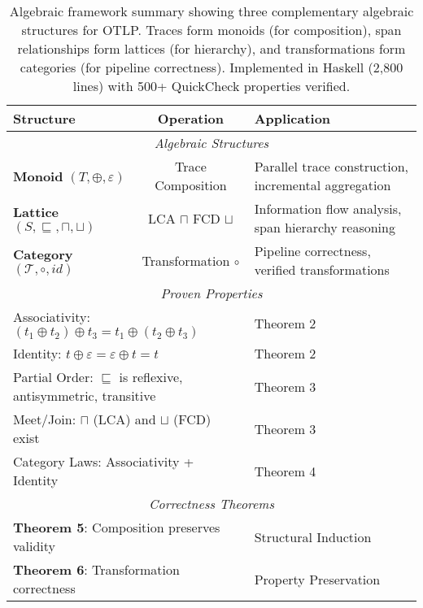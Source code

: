 
\begin{table}[t]
\centering
\caption{Algebraic framework summary showing three complementary algebraic structures for OTLP. Traces form monoids (for composition), span relationships form lattices (for hierarchy), and transformations form categories (for pipeline correctness). Implemented in Haskell (2,800 lines) with 500+ QuickCheck properties verified.}
\label{tab:algebraic-framework}
\small
\begin{tabular}{|l|c|p{4cm}|}
\hline
\textbf{Structure} & \textbf{Operation} & \textbf{Application} \\
\hline
\hline
\multicolumn{3}{|c|}{\textit{Algebraic Structures}} \\
\hline
\makecell[l]{\textbf{Monoid}\\ $(T, \oplus, \varepsilon)$} & \makecell{Trace\\ Composition} & Parallel trace construction, incremental aggregation \\
\hline
\makecell[l]{\textbf{Lattice}\\ $(S, \sqsubseteq, \sqcap, \sqcup)$} & \makecell{LCA $\sqcap$\\ FCD $\sqcup$} & Information flow analysis, span hierarchy reasoning \\
\hline
\makecell[l]{\textbf{Category}\\ $(\mathcal{T}, \circ, id)$} & \makecell{Transformation\\ $\circ$} & Pipeline correctness, verified transformations \\
\hline
\hline
\multicolumn{3}{|c|}{\textit{Proven Properties}} \\
\hline
\multicolumn{2}{|l|}{Associativity: $(t_1 \oplus t_2) \oplus t_3 = t_1 \oplus (t_2 \oplus t_3)$} & Theorem 2 \\
\multicolumn{2}{|l|}{Identity: $t \oplus \varepsilon = \varepsilon \oplus t = t$} & Theorem 2 \\
\multicolumn{2}{|l|}{Partial Order: $\sqsubseteq$ is reflexive, antisymmetric, transitive} & Theorem 3 \\
\multicolumn{2}{|l|}{Meet/Join: $\sqcap$ (LCA) and $\sqcup$ (FCD) exist} & Theorem 3 \\
\multicolumn{2}{|l|}{Category Laws: Associativity + Identity} & Theorem 4 \\
\hline
\hline
\multicolumn{3}{|c|}{\textit{Correctness Theorems}} \\
\hline
\multicolumn{2}{|l|}{\textbf{Theorem 5}: Composition preserves validity} & Structural Induction \\
\multicolumn{2}{|l|}{\textbf{Theorem 6}: Transformation correctness} & Property Preservation \\
\hline
\end{tabular}


\end{table}
